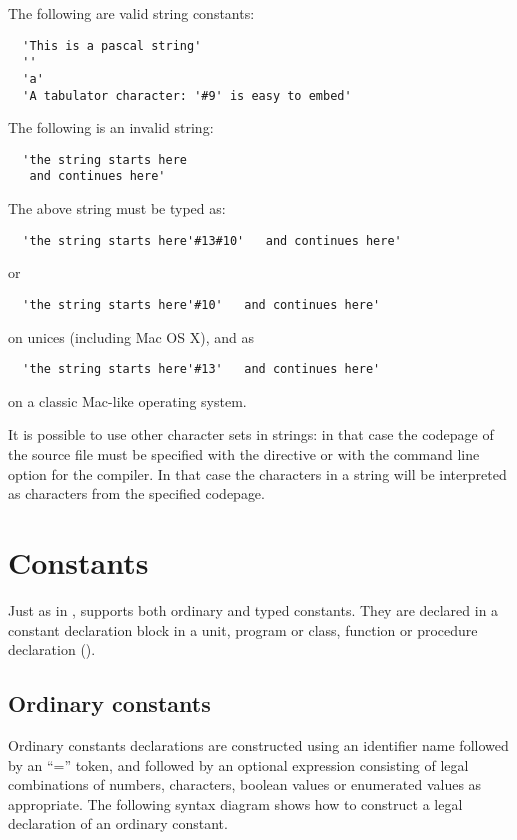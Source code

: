 The following are valid string constants:
\begin{verbatim}
  'This is a pascal string'
  ''
  'a'
  'A tabulator character: '#9' is easy to embed'
\end{verbatim}
The following is an invalid string:
\begin{verbatim}
  'the string starts here
   and continues here'
\end{verbatim}
The above string must be typed as:
\begin{verbatim}
  'the string starts here'#13#10'   and continues here'
\end{verbatim}
or
\begin{verbatim}
  'the string starts here'#10'   and continues here'
\end{verbatim}
on unices (including Mac OS X), and as
\begin{verbatim}
  'the string starts here'#13'   and continues here'
\end{verbatim}
on a classic Mac-like operating system.

It is possible to use other character sets in strings: in that case the
codepage of the source file must be specified with the 
directive or with the  command line option for the compiler. In that
case the characters in a string will be interpreted as characters from the
specified codepage.

\chapter{Constants}
 
Just as in \tp, \fpc supports both ordinary and typed constants. They are
declared in a constant declaration block in a unit, program or class, function or
procedure declaration ().

\section{Ordinary constants}
 
Ordinary constants declarations are constructed using an identifier name
followed by an ``='' token, and followed by an optional expression consisting
of legal combinations of numbers, characters, boolean values or enumerated
values as appropriate. The following syntax diagram shows how to construct
a legal declaration of an ordinary constant.

